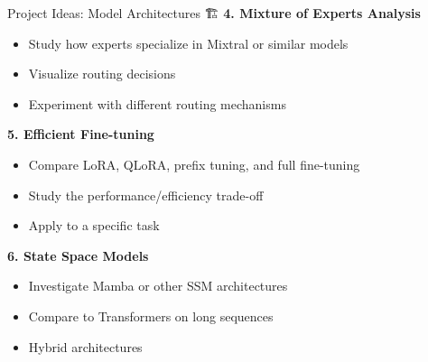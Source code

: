 \documentclass[aspectratio=169]{beamer}
\begin{document}
\begin{frame}[shrink=10]{Project Ideas: Model Architectures 🏗️}
\textbf{4. Mixture of Experts Analysis}
\begin{itemize}\setlength{\itemsep}{0pt}
    \item Study how experts specialize in Mixtral or similar models
    \item Visualize routing decisions
    \item Experiment with different routing mechanisms
\end{itemize}

\vspace{0.5em}

\textbf{5. Efficient Fine-tuning}
\begin{itemize}\setlength{\itemsep}{0pt}
    \item Compare LoRA, QLoRA, prefix tuning, and full fine-tuning
    \item Study the performance/efficiency trade-off
    \item Apply to a specific task
\end{itemize}

\vspace{0.5em}

\textbf{6. State Space Models}
\begin{itemize}\setlength{\itemsep}{0pt}
    \item Investigate Mamba or other SSM architectures
    \item Compare to Transformers on long sequences
    \item Hybrid architectures
\end{itemize}
\end{frame}
\end{document}
